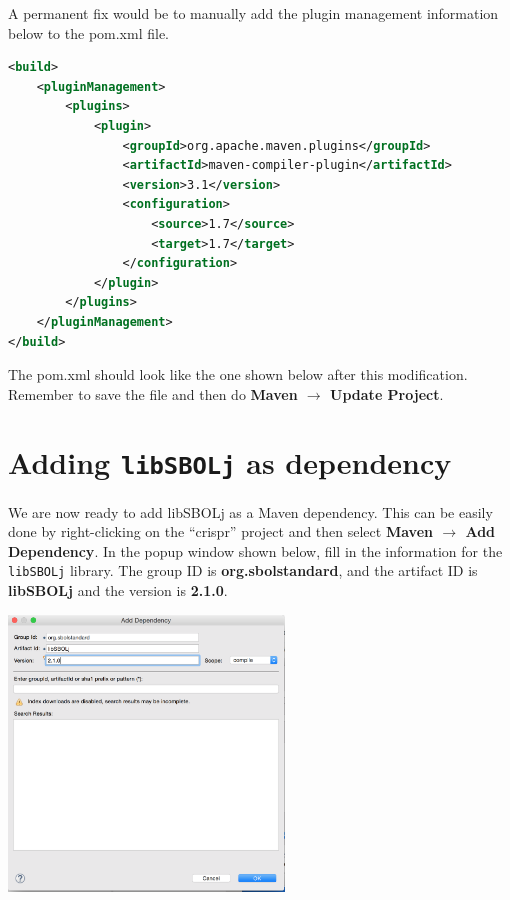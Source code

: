 A permanent fix would be to manually add the plugin management information below to the pom.xml file.

\begin{minipage}{\textwidth} 
\begin{lstlisting}[language=xml,basicstyle=\footnotesize\ttfamily]
<build>
    <pluginManagement>
        <plugins>
            <plugin>
                <groupId>org.apache.maven.plugins</groupId>
                <artifactId>maven-compiler-plugin</artifactId>
                <version>3.1</version>
                <configuration>
                    <source>1.7</source>
                    <target>1.7</target>
                </configuration>
            </plugin>
        </plugins>
    </pluginManagement>
</build>
\end{lstlisting}
\end{minipage}

The pom.xml should look like the one shown below after this modification. Remember to save the file and then do {\bf Maven $\rightarrow$  Update Project}.

\begin{minipage}{\textwidth} 

\end{minipage}

\section*{Adding {\tt libSBOLj} as dependency}
We are now ready to add libSBOLj as a Maven dependency. This can be easily done by right-clicking on the ``crispr'' project and then select {\bf Maven $\rightarrow$ Add Dependency}.
In the popup window shown below, fill in the information for the {\tt libSBOLj} library. The group ID is {\bf org.sbolstandard}, and the artifact ID is {\bf libSBOLj} and the version is {\bf 2.1.0}. 
\begin{center}
  \includegraphics[width=0.55\textwidth]{figures/addMavenDependency2}
\end{center}

